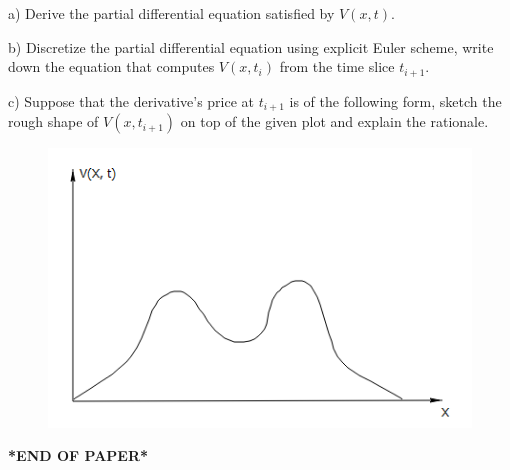 \documentclass[11pt,a4paper,hidelinks,fleqn]{article}            %
\begin{document}
a) Derive the partial differential equation satisfied by $V(x, t)$.

b) Discretize the partial differential equation using explicit Euler scheme,
write down the equation that computes $V(x, t_i)$ from the time slice $t_{i+1}$.

c) Suppose that the derivative's price at $t_{i+1}$ is of the following form,
sketch the rough shape of $V(x, t_{i+1})$ on top of the given plot and explain the rationale.
\begin{figure}[h]
\includegraphics[scale=0.9]{./6c}
\end{figure}

\textbf{*END OF PAPER*}
\end{document}
